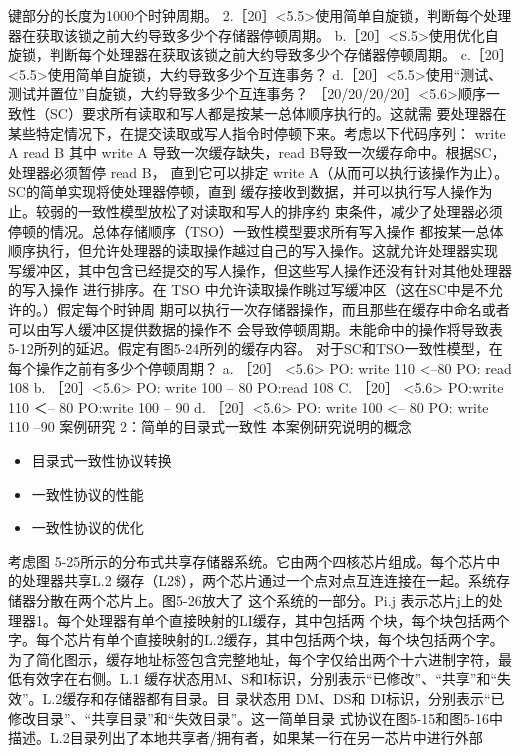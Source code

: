 键部分的长度为1000个时钟周期。
2.［20］<5.5>使用简单自旋锁，判断每个处理器在获取该锁之前大约导致多少个存储器停顿周期。
b.［20］<S.5>使用优化自旋锁，判断每个处理器在获取该锁之前大约导致多少个存储器停顿周期。
c.［20］<5.5>使用简单自旋锁，大约导致多少个互连事务？
d.［20］<5.5>使用“测试、测试并置位”自旋锁，大约导致多少个互连事务？
［20/20/20/20］<5.6>顺序一致性（SC）要求所有读取和写人都是按某一总体顺序执行的。这就需
要处理器在某些特定情况下，在提交读取或写人指令时停顿下来。考虑以下代码序列：
write A
read B
其中 write A 导致一次缓存缺失，read B导致一次缓存命中。根据SC，处理器必须暂停 read B，
直到它可以排定 write A（从而可以执行该操作为止）。SC的简单实现将使处理器停顿，直到
缓存接收到数据，并可以执行写人操作为止。较弱的一致性模型放松了对读取和写人的排序约
束条件，减少了处理器必须停顿的情况。总体存储顺序（TSO）一致性模型要求所有写入操作
都按某一总体顺序执行，但允许处理器的读取操作越过自己的写入操作。这就允许处理器实现
写缓冲区，其中包含已经提交的写人操作，但这些写人操作还没有针对其他处理器的写入操作
进行排序。在 TSO 中允许读取操作眺过写缓冲区（这在SC中是不允许的。）假定每个时钟周
期可以执行一次存储器操作，而且那些在缓存中命名或者可以由写人缓冲区提供数据的操作不
会导致停顿周期。未能命中的操作将导致表5-12所列的延迟。假定有图5-24所列的缓存内容。
对于SC和TSO一致性模型，在每个操作之前有多少个停顿周期？
a. ［20］ <5.6>
PO: write 110 <--80
PO: read 108
b. ［20］<5.6>
PO: write 100
-- 80
PO:read 108
C. ［20］ <5.6>
PO:write 110
＜-- 80
PO:write 100
-- 90
d. ［20］<5.6>
PO: write 100 <-- 80
PO: write 110 --90
案例研究 2：简单的目录式一致性
本案例研究说明的概念
\begin{itemize}
    \item 目录式一致性协议转换
    \item 一致性协议的性能
    \item 一致性协议的优化
\end{itemize}
考虑图 5-25所示的分布式共享存储器系统。它由两个四核芯片组成。每个芯片中的处理器共享L.2
缀存（L2\$），两个芯片通过一个点对点互连连接在一起。系统存储器分散在两个芯片上。图5-26放大了
这个系统的一部分。Pi.j 表示芯片j上的处理器1。每个处理器有单个直接映射的LI缓存，其中包括两
个块，每个块包括两个字。每个芯片有单个直接映射的L.2缓存，其中包括两个块，每个块包括两个字。
为了简化图示，缓存地址标签包含完整地址，每个字仅给出两个十六进制字符，最低有效字在右侧。L.1
缓存状态用M、S和I标识，分别表示“已修改”、“共享”和“失效”。L.2缓存和存储器都有目录。目
录状态用 DM、DS和 DI标识，分别表示“已修改目录”、“共享目录”和“失效目录”。这一简单目录
式协议在图5-15和图5-16中描述。L.2目录列出了本地共享者/拥有者，如果某一行在另一芯片中进行外部
